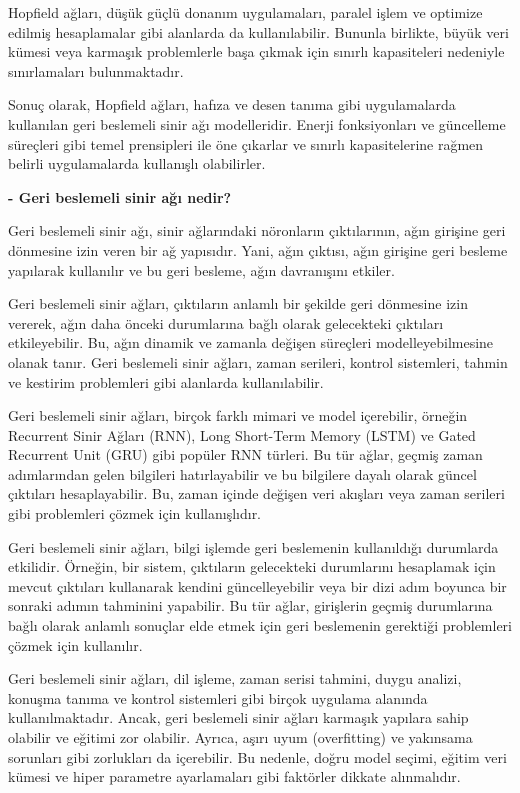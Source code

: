 \documentclass[11pt]{article}
\begin{document}
    Hopfield ağları, düşük güçlü donanım uygulamaları, paralel işlem ve optimize edilmiş hesaplamalar gibi alanlarda da kullanılabilir. Bununla birlikte, büyük veri kümesi veya karmaşık problemlerle başa çıkmak için sınırlı kapasiteleri nedeniyle sınırlamaları bulunmaktadır.
    
    Sonuç olarak, Hopfield ağları, hafıza ve desen tanıma gibi uygulamalarda kullanılan geri beslemeli sinir ağı modelleridir. Enerji fonksiyonları ve güncelleme süreçleri gibi temel prensipleri ile öne çıkarlar ve sınırlı kapasitelerine rağmen belirli uygulamalarda kullanışlı olabilirler.

\textbf{- Geri beslemeli sinir ağı nedir?}

    Geri beslemeli sinir ağı, sinir ağlarındaki nöronların çıktılarının, ağın girişine geri dönmesine izin veren bir ağ yapısıdır. Yani, ağın çıktısı, ağın girişine geri besleme yapılarak kullanılır ve bu geri besleme, ağın davranışını etkiler.
    
    Geri beslemeli sinir ağları, çıktıların anlamlı bir şekilde geri dönmesine izin vererek, ağın daha önceki durumlarına bağlı olarak gelecekteki çıktıları etkileyebilir. Bu, ağın dinamik ve zamanla değişen süreçleri modelleyebilmesine olanak tanır. Geri beslemeli sinir ağları, zaman serileri, kontrol sistemleri, tahmin ve kestirim problemleri gibi alanlarda kullanılabilir.
    
    Geri beslemeli sinir ağları, birçok farklı mimari ve model içerebilir, örneğin Recurrent Sinir Ağları (RNN), Long Short-Term Memory (LSTM) ve Gated Recurrent Unit (GRU) gibi popüler RNN türleri. Bu tür ağlar, geçmiş zaman adımlarından gelen bilgileri hatırlayabilir ve bu bilgilere dayalı olarak güncel çıktıları hesaplayabilir. Bu, zaman içinde değişen veri akışları veya zaman serileri gibi problemleri çözmek için kullanışlıdır.
    
    Geri beslemeli sinir ağları, bilgi işlemde geri beslemenin kullanıldığı durumlarda etkilidir. Örneğin, bir sistem, çıktıların gelecekteki durumlarını hesaplamak için mevcut çıktıları kullanarak kendini güncelleyebilir veya bir dizi adım boyunca bir sonraki adımın tahminini yapabilir. Bu tür ağlar, girişlerin geçmiş durumlarına bağlı olarak anlamlı sonuçlar elde etmek için geri beslemenin gerektiği problemleri çözmek için kullanılır.
    
    Geri beslemeli sinir ağları, dil işleme, zaman serisi tahmini, duygu analizi, konuşma tanıma ve kontrol sistemleri gibi birçok uygulama alanında kullanılmaktadır. Ancak, geri beslemeli sinir ağları karmaşık yapılara sahip olabilir ve eğitimi zor olabilir. Ayrıca, aşırı uyum (overfitting) ve yakınsama sorunları gibi zorlukları da içerebilir. Bu nedenle, doğru model seçimi, eğitim veri kümesi ve hiper parametre ayarlamaları gibi faktörler dikkate alınmalıdır.
\end{document}

